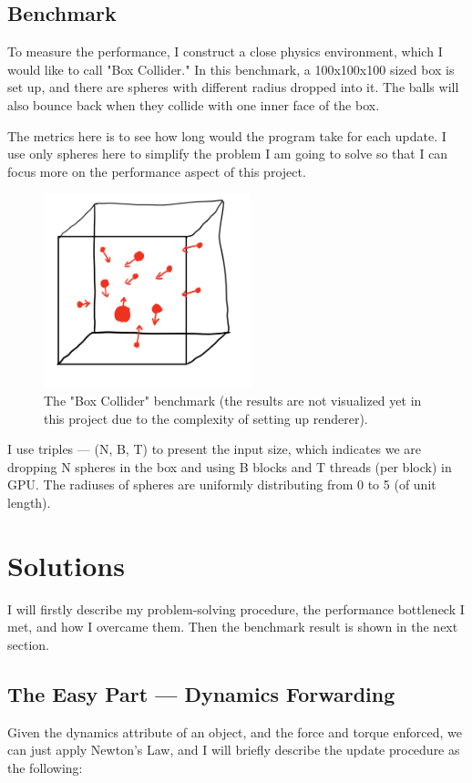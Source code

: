\documentclass[11pt]{article}
\begin{document}
\subsection{Benchmark}
\label{sec:org32c8596}
To measure the performance, I construct a close physics environment, which I would like to call "Box Collider." In this benchmark, a 100x100x100 sized box is set up, and there are spheres with different radius dropped into it. The balls will also bounce back when they collide with one inner face of the box.

The metrics here is to see how long would the program take for each update. I use only spheres here to simplify the problem I am going to solve so that I can focus more on the performance aspect of this project.

\begin{figure}[htbp]
\centering
\includegraphics[width=6cm]{./rep_4.png}
\caption{The "Box Collider" benchmark (the results are not visualized yet in this project due to the complexity of setting up renderer).}
\end{figure}

I use triples --- (N, B, T) to present the input size, which indicates we are dropping N spheres in the box and using B blocks and T threads (per block) in GPU. The radiuses of spheres are uniformly distributing from 0 to 5 (of unit length).

\section{Solutions}
\label{sec:org882432b}
I will firstly describe my problem-solving procedure, the performance bottleneck I met, and how I overcame them. Then the benchmark result is shown in the next section.
\subsection{The Easy Part --- Dynamics Forwarding}
\label{sec:orgc858847}
Given the dynamics attribute of an object, and the force and torque enforced, we can just apply Newton's Law, and I will briefly describe the update procedure as the following: 
\end{document}
